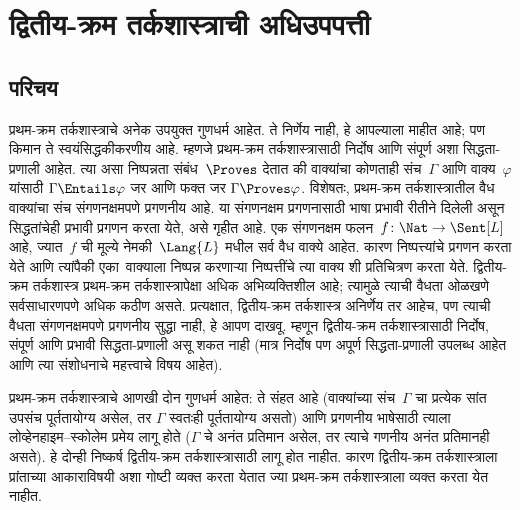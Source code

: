 \chapter{द्वितीय-क्रम तर्कशास्त्राची अधिउपपत्ती}\label{sol:met:chap}









\section{परिचय}\label{sol:met:int:sec}


प्रथम-क्रम तर्कशास्त्राचे अनेक उपयुक्त गुणधर्म आहेत. ते निर्णेय नाही,
हे आपल्याला माहीत आहे; पण किमान ते स्वयंसिद्धकीकरणीय आहे. म्हणजे
प्रथम-क्रम तर्कशास्त्रासाठी निर्दोष आणि संपूर्ण अशा सिद्धता-प्रणाली
आहेत. त्या असा निष्पन्नता संबंध~$\Proves$ देतात की
वाक्यांचा कोणताही संच~$\Gamma$ आणि वाक्य~$\varphi$
यांसाठी $\Gamma \Entails \varphi$ जर आणि फक्त जर
$\Gamma \Proves \varphi$. विशेषतः, प्रथम-क्रम तर्कशास्त्रातील
वैध वाक्यांचा संच संगणनक्षमपणे प्रगणनीय आहे. या संगणनक्षम प्रगणनासाठी भाषा प्रभावी रीतीने
दिलेली असून सिद्धतांचेही प्रभावी प्रगणन करता येते, असे गृहीत आहे. एक संगणनक्षम फलन~$f\colon \Nat \to
\Sent[L]$ आहे, ज्यात~$f$ ची मूल्ये नेमकी~$\Lang{L}$ मधील सर्व
वैध वाक्ये आहेत. कारण निष्पत्त्यांचे प्रगणन
करता येते आणि त्यांपैकी एका~वाक्याला निष्पन्न
करणाऱ्या निष्पत्तींचे त्या वाक्य शी प्रतिचित्रण
करता येते. द्वितीय-क्रम तर्कशास्त्र प्रथम-क्रम तर्कशास्त्रापेक्षा
अधिक अभिव्यक्तिशील आहे; त्यामुळे त्याची वैधता ओळखणे
सर्वसाधारणपणे अधिक कठीण असते. प्रत्यक्षात, द्वितीय-क्रम
तर्कशास्त्र अनिर्णेय तर आहेच, पण त्याची वैधता
संगणनक्षमपणे प्रगणनीय सुद्धा नाही, हे आपण दाखवू. म्हणून
द्वितीय-क्रम तर्कशास्त्रासाठी निर्दोष, संपूर्ण आणि प्रभावी
सिद्धता-प्रणाली असू शकत नाही (मात्र निर्दोष पण अपूर्ण सिद्धता-प्रणाली उपलब्ध
आहेत आणि त्या संशोधनाचे महत्त्वाचे विषय आहेत).

प्रथम-क्रम तर्कशास्त्राचे आणखी दोन गुणधर्म आहेत: ते संहत
आहे (वाक्यांच्या संच~$\Gamma$ चा प्रत्येक सांत उपसंच
पूर्ततायोग्य असेल, तर $\Gamma$ स्वतःही पूर्ततायोग्य असतो)
आणि प्रगणनीय भाषेसाठी त्याला लोव्हेनहाइम--स्कोलेम प्रमेय लागू होते
($\Gamma$ चे अनंत प्रतिमान असेल, तर त्याचे
गणनीय अनंत प्रतिमानही असते). हे दोन्ही निष्कर्ष
द्वितीय-क्रम तर्कशास्त्रासाठी लागू होत नाहीत. कारण
द्वितीय-क्रम तर्कशास्त्राला प्रांताच्या आकाराविषयी
अशा गोष्टी व्यक्त करता येतात ज्या प्रथम-क्रम तर्कशास्त्राला
व्यक्त करता येत नाहीत.












